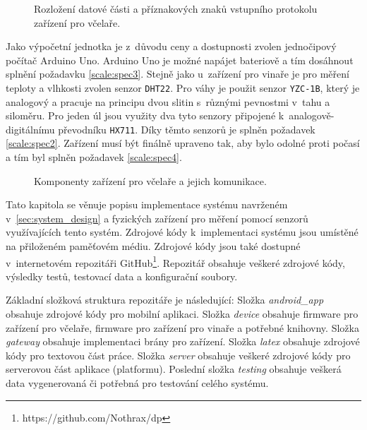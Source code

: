 \begin{figure}[h]
  \centering
  
  \caption{Rozložení datové části a příznakových znaků vstupního protokolu zařízení pro včelaře.}
  \label{pic:scale_data}
\end{figure}

Jako výpočetní jednotka je z~důvodu ceny a dostupnosti zvolen jednočipový počítač Arduino Uno. Arduino Uno je možné napájet bateriově a tím dosáhnout splnění požadavku \ref{scale:spec3}. Stejně jako u~zařízení pro vinaře je pro měření teploty a vlhkosti zvolen senzor \texttt{DHT22}. Pro váhy je použit senzor \texttt{YZC-1B}, který je analogový a pracuje na principu dvou slitin s~různými pevnostmi v~tahu a siloměru. Pro jeden úl jsou využity dva tyto senzory připojené k~analogově-digitálnímu převodníku \texttt{HX711}. Díky těmto senzorů je splněn požadavek \ref{scale:spec2}. Zařízení musí být finálně upraveno tak, aby bylo odolné proti počasí a tím byl splněn požadavek \ref{scale:spec4}.


\begin{figure}[h]
  \centering
  
  \caption{Komponenty zařízení pro včelaře a jejich komunikace.}
  \label{dia:scale_components}
\end{figure}

 \label{sec:impelementation}
Tato kapitola se věnuje popisu implementace systému navrženém v~\ref{sec:system_design} a fyzických zařízení pro měření pomocí senzorů využívajících tento systém. Zdrojové kódy k~implementaci systému jsou umístěné na přiloženém paměťovém médiu. Zdrojové kódy jsou také dostupné v~internetovém repozitáři GitHub\footnote{https://github.com/Nothrax/dp}. Repozitář obsahuje veškeré zdrojové kódy, výsledky testů, testovací data a konfigurační soubory.

Základní složková struktura repozitáře je následující: 
Složka \textit{android\_app} obsahuje zdrojové kódy pro mobilní aplikaci. Složka \textit{device} obsahuje firmware pro zařízení pro včelaře, firmware pro zařízení pro vinaře a potřebné knihovny. Složka \textit{gateway} obsahuje implementaci brány pro zařízení. Složka \textit{latex} obsahuje zdrojové kódy pro textovou část práce. Složka \textit{server} obsahuje veškeré zdrojové kódy pro serverovou část aplikace (platformu). Poslední složka \textit{testing} obsahuje veškerá data vygenerovaná či potřebná pro testování celého systému.


